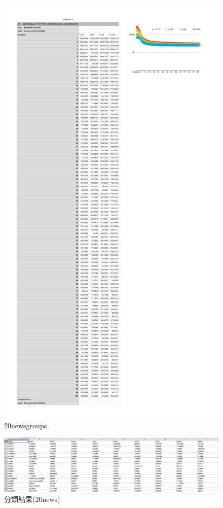 \documentclass[uplatex,dvipdfmx]{jsarticle}
\begin{document}
\begin{figure}[t]
\includegraphics[width=13cm,pagebox=cropbox]{20news.pdf}
\caption{20newsgroups}
\end{figure}

\begin{figure}[ht]
\includegraphics[width=16cm]{20news10.png}
\caption{分類結果(20news)}
\end{figure}
\end{document}

